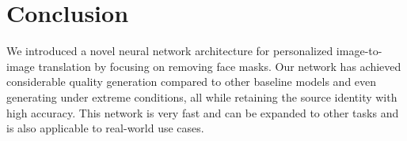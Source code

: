 \documentclass[sigconf,authorversion,nonacm]{acmart}
\begin{document}
\section{Conclusion}
We introduced a novel neural network architecture for personalized image-to-image translation by
focusing on removing face masks. Our network has achieved considerable quality generation compared
to other baseline models and even generating under extreme conditions, all while retaining the
source identity with high accuracy. This network is very fast and can be expanded to other tasks
and is also applicable to real-world use cases.



\end{document}
